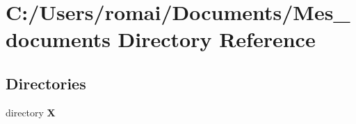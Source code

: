\section{C\+:/\+Users/romai/\+Documents/\+Mes\+\_\+documents Directory Reference}
\label{dir_4cfdab58f539b0983ca63aa6c83cff1e}
\subsection*{Directories}
\begin{DoxyCompactItemize}
\item 
directory \textbf{ X}
\end{DoxyCompactItemize}
